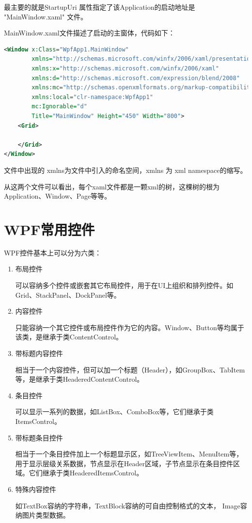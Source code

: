 最主要的就是StartupUri 属性指定了该Application的启动地址是  "MainWindow.xaml" 文件。

 MainWindow.xaml文件描述了启动的主窗体，代码如下：

 \begin{lstlisting}[language=xml]
<Window x:Class="WpfApp1.MainWindow"
        xmlns="http://schemas.microsoft.com/winfx/2006/xaml/presentation"
        xmlns:x="http://schemas.microsoft.com/winfx/2006/xaml"
        xmlns:d="http://schemas.microsoft.com/expression/blend/2008"
        xmlns:mc="http://schemas.openxmlformats.org/markup-compatibility/2006"
        xmlns:local="clr-namespace:WpfApp1"
        mc:Ignorable="d"
        Title="MainWindow" Height="450" Width="800">
    <Grid>

    </Grid>
</Window>
\end{lstlisting}

文件中出现的 xmlns为文件中引入的命名空间，xmlns 为 xml namespace的缩写。

从这两个文件可以看出，每个xaml文件都是一颗xml的树，这棵树的根为Application、Window、Page等等。







\section{WPF常用控件}

WPF控件基本上可以分为六类：

\begin{enumerate}
    \item 布局控件
    
    可以容纳多个控件或嵌套其它布局控件，用于在UI上组织和排列控件。如Grid、StackPanel、DockPanel等。
    
    \item 内容控件
    
    只能容纳一个其它控件或布局控件作为它的内容。Window、Button等均属于该类，是继承于类ContentControl。
    
    \item 带标题内容控件
    
    相当于一个内容控件，但可以加一个标题（Header），如GroupBox、TabItem等，是继承于类HeaderedContentControl。
    
    \item 条目控件
    
    可以显示一系列的数据，如ListBox、ComboBox等，它们继承于类ItemsControl。
    
    \item 带标题条目控件
    
    相当于一个条目控件加上一个标题显示区，如TreeViewItem、MenuItem等，用于显示层级关系数据，节点显示在Header区域，子节点显示在条目控件区域。它们继承于类HeaderedItemsControl。
    
    \item 特殊内容控件
    
    如TextBox容纳的字符串，TextBlock容纳的可自由控制格式的文本， Image容纳图片类型数据。
    
\end{enumerate}




